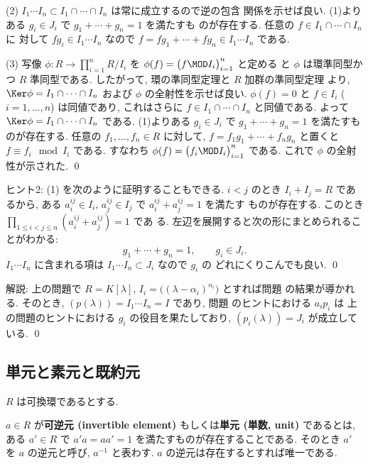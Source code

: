 \documentclass[12pt,twoside]{jarticle}
\begin{document}
(2) $I_1\cdots I_n\subset I_1\cap\cdots\cap I_n$ は常に成立するので逆の包含
関係を示せば良い.  (1)よりある $g_i\in J_i$ で $g_1+\cdots+g_n=1$ を満たすも
のが存在する.  任意の $f\in I_1\cap\cdots\cap I_n$ に
対して $fg_i\in I_1\cdots I_n$ なので $f=fg_1+\cdots+fg_n\in I_1\cdots I_n$ 
である.
 
(3) 写像 $\phi:R\to\prod_{i=1}^n R/I_i$ 
を $\phi(f)=\bigl(f\MOD I_i\bigr)_{i=1}^n$ と定める
と $\phi$ は環準同型かつ $R$ 準同型である.
したがって, 環の準同型定理と $R$ 加群の準同型定理
より, $\Ker\phi=I_1\cap\cdots\cap I_n$ および $\phi$ の全射性を示せば良い.
$\phi(f)=0$ と $f\in I_i$ ($i=1,\dots,n$) は同値であり,
これはさらに $f\in I_1\cap\cdots\cap I_n$ と同値である.
よって $\Ker\phi=I_1\cap\cdots\cap I_n$ である. 
(1)よりある $g_i\in J_i$ で $g_1+\cdots+g_n=1$ を満たすものが存在する.
任意の $f_1,\dots,f_n\in R$ に対して, 
$f=f_1g_1+\cdots+f_ng_n$ と置くと $f\equiv f_i\mod I_i$ である. 
すなわち $\phi(f)= \bigl(f_i\MOD I_i\bigr)_{i=1}^n$ である.
これで $\phi$ の全射性が示された.
\qed

\medskip
\noindent
ヒント2: (1) を次のように証明することもできる. 
$i<j$ のとき $I_i+I_j=R$ であるから, 
ある $a^{ij}_i\in I_i$, $a^{ij}_j\in I_j$ で $a^{ij}_i+a^{ij}_j=1$ を満たす
ものが存在する.  このとき $\prod_{1\le i<j\le n}(a^{ij}_i+a^{ij}_j)=1$ であ
る. 左辺を展開すると次の形にまとめられることがわかる:
\begin{equation*}
  g_1+\cdots+g_n=1, \qquad g_i\in J_i.
\end{equation*}
$I_1\cdots I_n$ に含まれる項は $I_1\cdots I_n\subset J_i$ なので $g_i$ の
どれにくりこんでも良い.
\qed

\medskip
\noindent
解説: 上の問題で $R=K[\lambda]$, $I_i=\bigl((\lambda-\alpha_i)^{n_i}\bigr)$ 
とすれば問題  の結果が導かれる.
そのとき, $(p(\lambda))=I_1\cdots I_n=I$ であり, 
問題  のヒントにおける $a_ip_i$ は
上の問題のヒントにおける $g_i$ の役目を果たしており, 
$(p_i(\lambda))=J_i$ が成立している.
\qed


\subsection{単元と素元と既約元}
\label{sec:factorization}

$R$ は可換環であるとする.

$a\in R$ が{\bf 可逆元 (invertible element)} もしくは{\bf 単元 (単数, unit)} 
であるとは, ある $a'\in R$ で $a'a=aa'=1$ を満たすものが存在することである. 
そのとき $a'$ を $a$ の逆元と呼び, $a^{-1}$ と表わす.
$a$ の逆元は存在するとすれば唯一である.
\end{document}
